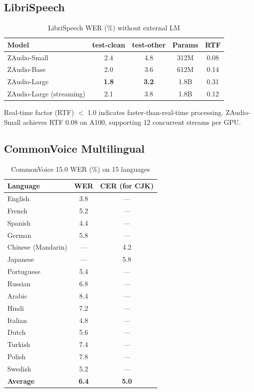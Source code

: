 \documentclass[11pt,a4paper]{article}
\begin{document}
\subsection{LibriSpeech}

\begin{table}[H]
\centering
\caption{LibriSpeech WER (\%) without external LM}
\label{tab:librispeech}
\begin{tabular}{lcccc}
\toprule
Model & test-clean & test-other & Params & RTF \\
\midrule
ZAudio-Small & 2.4 & 4.8 & 312M & 0.08 \\
ZAudio-Base & 2.0 & 3.6 & 612M & 0.14 \\
ZAudio-Large & \textbf{1.8} & \textbf{3.2} & 1.8B & 0.31 \\
ZAudio-Large (streaming) & 2.1 & 3.8 & 1.8B & 0.12 \\
\bottomrule
\end{tabular}
\end{table}

Real-time factor (RTF) $<$ 1.0 indicates faster-than-real-time processing. ZAudio-Small achieves RTF 0.08 on A100, supporting 12 concurrent streams per GPU.

\subsection{CommonVoice Multilingual}

\begin{table}[H]
\centering
\caption{CommonVoice 15.0 WER (\%) on 15 languages}
\label{tab:commonvoice}
\begin{tabular}{lcc}
\toprule
Language & WER & CER (for CJK) \\
\midrule
English & 3.8 & — \\
French & 5.2 & — \\
Spanish & 4.4 & — \\
German & 5.8 & — \\
Chinese (Mandarin) & — & 4.2 \\
Japanese & — & 5.8 \\
Portuguese & 5.4 & — \\
Russian & 6.8 & — \\
Arabic & 8.4 & — \\
Hindi & 7.2 & — \\
Italian & 4.8 & — \\
Dutch & 5.6 & — \\
Turkish & 7.4 & — \\
Polish & 7.8 & — \\
Swedish & 5.2 & — \\
\midrule
\textbf{Average} & \textbf{6.4} & \textbf{5.0} \\
\bottomrule
\end{tabular}
\end{table}
\end{document}
